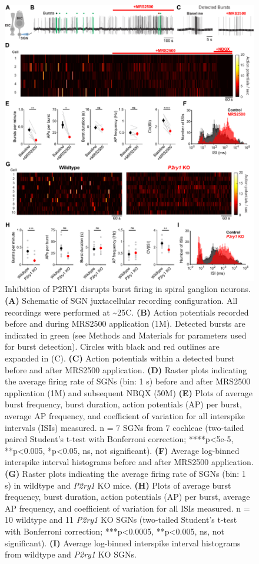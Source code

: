 \documentclass[9pt,lineno]{elife}
\begin{document}
\begin{figure}
\begin{fullwidth}
\includegraphics[width=.95\linewidth]{figures/Fig6.pdf}
\caption{Inhibition of P2RY1 disrupts burst firing in spiral ganglion neurons.
\textbf{(A)} Schematic of SGN juxtacellular recording configuration. All recordings were performed at \textasciitilde 25\textdegree C.
\textbf{(B)} Action potentials recorded before and during MRS2500 application (1\textmu M). Detected bursts are indicated in green (see Methods and Materials for parameters used for burst detection). Circles with black and red outlines are expanded in (C).
\textbf{(C)} Action potentials within a detected burst before and after MRS2500 application.
\textbf{(D)} Raster plots indicating the average firing rate of SGNs (bin: 1 s) before and after MRS2500 application (1\textmu M) and subsequent NBQX (50\textmu M)
\textbf{(E)} Plots of average burst frequency, burst duration, action potentials (AP) per burst, average AP frequency, and coefficient of variation for all interspike intervals (ISIs) measured. n = 7 SGNs from 7 cochleae (two-tailed paired Student's t-test with Bonferroni correction; ****p<5e-5, **p<0.005, *p<0.05, ns, not significant).
\textbf{(F)} Average log-binned interspike interval histograms before and after MRS2500 application.
\textbf{(G)} Raster plots indicating the average firing rate of SGNs (bin: 1 s) in wildtype and \textit{P2ry1} KO mice. 
\textbf{(H)} Plots of average burst frequency, burst duration, action potentials (AP) per burst, average AP frequency, and coefficient of variation for all ISIs measured. n = 10 wildtype and 11 \textit{P2ry1} KO SGNs (two-tailed Student's t-test with Bonferroni correction; ***p<0.0005, **p<0.005, ns, not significant).
\textbf{(I)} Average log-binned interspike interval histograms from wildtype and \textit{P2ry1} KO SGNs.
}
\label{fig:f6}
\end{fullwidth}
\end{figure}
\end{document}
